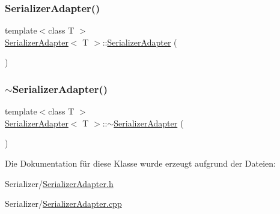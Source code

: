 \subsubsection{\texorpdfstring{Serializer\+Adapter()}{SerializerAdapter()}}
{\footnotesize\ttfamily template$<$class T $>$ \\
\hyperlink{class_serializer_adapter}{Serializer\+Adapter}$<$ T $>$\+::\hyperlink{class_serializer_adapter}{Serializer\+Adapter} (\begin{DoxyParamCaption}{ }\end{DoxyParamCaption})}

\hypertarget{class_serializer_adapter_ab768851e14fa435e50f4d39faacaea89}{}\label{class_serializer_adapter_ab768851e14fa435e50f4d39faacaea89} 
\subsubsection{\texorpdfstring{$\sim$\+Serializer\+Adapter()}{~SerializerAdapter()}}
{\footnotesize\ttfamily template$<$class T $>$ \\
\hyperlink{class_serializer_adapter}{Serializer\+Adapter}$<$ T $>$\+::$\sim$\hyperlink{class_serializer_adapter}{Serializer\+Adapter} (\begin{DoxyParamCaption}{ }\end{DoxyParamCaption})\hspace{0.3cm}{\ttfamily [virtual]}}



Die Dokumentation für diese Klasse wurde erzeugt aufgrund der Dateien\+:\begin{DoxyCompactItemize}
\item 
Serializer/\hyperlink{_serializer_adapter_8h}{Serializer\+Adapter.\+h}\item 
Serializer/\hyperlink{_serializer_adapter_8cpp}{Serializer\+Adapter.\+cpp}\end{DoxyCompactItemize}
